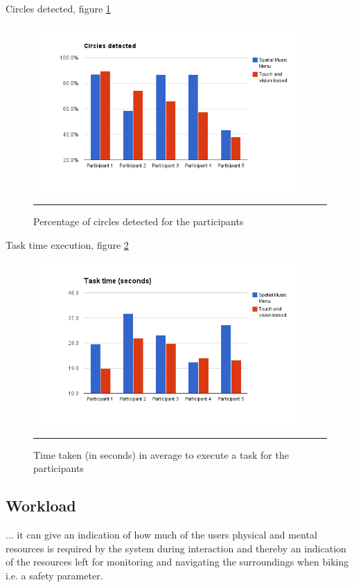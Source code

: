 
Circles detected, figure \ref{fig:resultscircles}

\begin{figure}[htbp]
	\centering
		\includegraphics[width=0.9\textwidth,height=\textheight,keepaspectratio]{./Figures/results_circles.png}
		\rule{35em}{1pt}
	\caption[Results circle detections]{Percentage of circles detected for the participants}
	\label{fig:resultscircles}
\end{figure}


Task time execution, figure \ref{fig:resultstasktime}

\begin{figure}[htbp]
	\centering
		\includegraphics[width=0.9\textwidth,height=\textheight,keepaspectratio]{./Figures/results_task_time.png}
		\rule{35em}{1pt}
	\caption[Results task time]{Time taken (in seconds) in average to execute a task for the participants}
	\label{fig:resultstasktime}
\end{figure}

\subsection{Workload}
... it can give an indication of how much of the users physical and mental resources is required by the system during interaction and thereby an indication of the resources left for monitoring and navigating the surroundings when biking i.e. a safety parameter.

